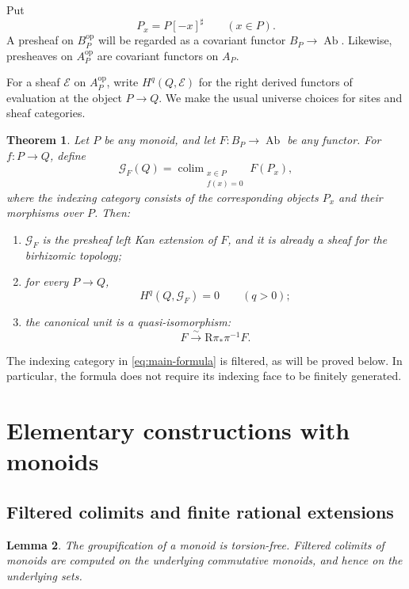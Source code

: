 \documentclass[11pt]{article}
\newtheorem{theorem}{Theorem}[section]
\newtheorem{lemma}[theorem]{Lemma}
\theoremstyle{definition}
\theoremstyle{remark}
\DeclareMathOperator{\colim}{colim}
\DeclareMathOperator{\Ab}{Ab}
\newcommand{\cG}{\mathcal G}
\begin{document}
Put
\[
P_x=P[-x]^\sharp\qquad(x\in P).
\]
A presheaf on \(B_P^{\mathrm{op}}\) will be regarded as a covariant
functor \(B_P\to\Ab\). Likewise, presheaves on \(A_P^{\mathrm{op}}\)
are covariant functors on \(A_P\).

For a sheaf \(\mathcal E\) on \(A_P^{\mathrm{op}}\), write
\(H^q(Q,\mathcal E)\) for the right derived functors of evaluation at
the object \(P\to Q\). We make the usual universe choices for sites
and sheaf categories.

\begin{theorem}\label{thm:main}
Let \(P\) be any monoid, and let \(F:B_P\to\Ab\) be any functor.
For \(f:P\to Q\), define
\begin{equation}\label{eq:main-formula}
\cG_F(Q)=
\colim_{\substack{x\in P\\f(x)=0}} F(P_x),
\end{equation}
where the indexing category consists of the corresponding objects
\(P_x\) and their morphisms over \(P\). Then:
\begin{enumerate}[label=\textup{(\roman*)}]
\item \(\cG_F\) is the presheaf left Kan extension of \(F\), and it is
already a sheaf for the birhizomic topology;
\item for every \(P\to Q\),
\[
H^q(Q,\cG_F)=0\qquad(q>0);
\]
\item the canonical unit is a quasi-isomorphism:
\[
F \xrightarrow{\ \sim\ } \mathrm R\pi_*\pi^{-1}F.
\]
\end{enumerate}
\end{theorem}

The indexing category in \eqref{eq:main-formula} is filtered, as will
be proved below. In particular, the formula does not require its
indexing face to be finitely generated.

\section{Elementary constructions with monoids}

\subsection{Filtered colimits and finite rational extensions}

\begin{lemma}\label{lem:filtered}
The groupification of a monoid is torsion-free. Filtered colimits of
monoids are computed on the underlying commutative monoids, and hence
on the underlying sets.
\end{lemma}
\end{document}
